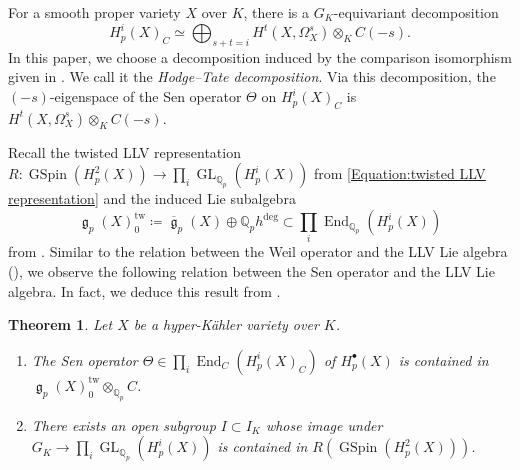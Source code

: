 \documentclass[12pt,reqno]{amsart}
\newtheorem{thm}{Theorem}[section]
\theoremstyle{definition}
\newcommand{\Q}{{\mathds Q}}
\newcommand\End{\mathop{\mathrm{End}}\nolimits}
\newcommand\GL{\mathop{\mathrm{GL}}\nolimits}
\renewcommand\ge{\mathop{\mathfrak{g}}\nolimits}
\newcommand\GSpin{\mathop{\mathrm{GSpin}}\nolimits}
\DeclareMathOperator{\tw}{tw}
\numberwithin{equation}{section}
\begin{document}
For a smooth proper variety $X$ over $K$,
there is
a $G_K$-equivariant decomposition
\[
H^i_p(X)_C \simeq \bigoplus_{s+t=i} H^t(X, \Omega^s_X) \otimes_K C(-s).
\]
In this paper,
we choose a decomposition induced by the comparison isomorphism given in
\cite[Theorem A1]{Tsuji02}.
We call it the \textit{Hodge--Tate decomposition}.
Via this decomposition,
the $(-s)$-eigenspace of the Sen operator $\Theta$ on $H^i_p(X)_C$ is $H^{t}(X, \Omega^s_{X})\otimes_K C(-s)$.

Recall the twisted LLV representation
$R \colon \GSpin(H^2_p(X)) \to \prod_i\GL_{\Q_p}(H^i_p(X))$
from \eqref{Equation:twisted LLV representation}
and the induced Lie subalgebra
\[
\ge_p(X)^{\tw}_0\coloneqq \overline{\ge}_p(X) \oplus \Q_ph^{\deg} \subset \prod_i\End_{\Q_p}(H^i_p(X))
\]
from .
Similar to the relation between the Weil operator and the LLV Lie algebra (), we observe the following relation between the Sen operator and the LLV Lie algebra.
In fact, we deduce this result from .


\begin{thm}\label{Theoremp:Sen is in g_0}
Let $X$ be a hyper-K\"ahler variety over $K$.
\begin{enumerate}
    \item The Sen operator
$\Theta \in \prod_i\End_{C}(H^i_p(X)_C)$
of
$H^\bullet_p(X)$ is contained in $\ge_p(X)^{\tw}_0 \otimes_{\Q_p} C$.
    \item There exists an open subgroup $I \subset I_K$ whose image
    under
    $G_K \to \prod_i\GL_{\Q_p}(H^i_p(X))$
    is contained in $R(\GSpin(H^2_p(X)))$.
\end{enumerate}
\end{thm}
\end{document}
